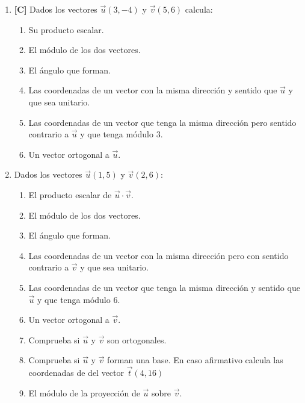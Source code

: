 \begin{enumerate}[topsep=0pt]
	
	\item \textbf{[C]}  Dados los vectores $ \overrightarrow{u}(3,-4)$ y $ \overrightarrow{v} (5,6) $ calcula:
	\begin{enumerate}[topsep=0pt]
		\item Su producto escalar.
		\item El módulo de los dos vectores.
		\item El ángulo que forman.
		\item Las coordenadas de un vector con la misma dirección y sentido que $\overrightarrow{u}$ y que sea unitario.
		\item Las coordenadas de un vector que tenga la misma dirección pero sentido contrario a $\overrightarrow{u}$ y que tenga módulo 3.
		\item Un vector ortogonal a $\overrightarrow{u}$.
	\end{enumerate}


	\item Dados los vectores $ \overrightarrow{u}(1,5)$ y $ \overrightarrow{v} (2,6) $:
	\begin{enumerate}[topsep=0pt]
		\item El producto escalar de $\overrightarrow{u} \cdot \overrightarrow{v}$.
		\item El módulo de los dos vectores.
		\item El ángulo que forman.
		\item Las coordenadas de un vector con la misma dirección  pero con sentido contrario a $\overrightarrow{v}$ y que sea unitario.
		\item Las coordenadas de un vector que tenga la misma dirección y sentido que $\overrightarrow{u}$ y que tenga módulo 6.
		\item Un vector ortogonal a $\overrightarrow{v}$.
		\item Comprueba si $\vec{u}$ y $\vec{v}$ son ortogonales.
		\item Comprueba si $\vec{u}$ y $\vec{v}$ forman una base. En caso afirmativo calcula las coordenadas de del vector $\overrightarrow{t}(4,16)$
		\item El módulo de la proyección de $\vec{u}$ sobre $\vec{v}$.
	\end{enumerate}



\end{enumerate}
